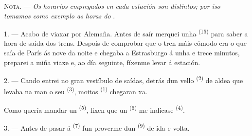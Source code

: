 %
%
%

\VUsaut{4.0mm}
\VUsaut{2.4mm}
\VUsaut{3.4mm}
\textsc{Nota.} --- \textit{Os horarios empregados en cada estación son distintos; por
iso tomamos como exemplo as horas do} .

1. --- Acabo de viaxar por Alemaña. Antes de saír merquei unha  \textsuperscript{(15)} para saber a hora de saída dos trens. Despois de
comprobar que o tren máis cómodo era o que saía de París ás nove da noite e chegaba a
Estrasburgo á unha e trece minutos, preparei a miña viaxe e, ao día seguinte,
fíxenme levar á estación.

2. --- Cando entrei no gran vestíbulo de saídas, detrás dun vello 
\textsuperscript{(2)} de aldea que levaba na man o seu 
\textsuperscript{(3)}, moitos  \textsuperscript{(1)} chegaran xa.

Como quería mandar un  \textsuperscript{(5)}, fixen que
un  \textsuperscript{(6)} me indicase 
\textsuperscript{(4)}.

3. --- Antes de pasar á  \textsuperscript{(7)} fun proverme
dun  \textsuperscript{(9)} de ida e volta.

